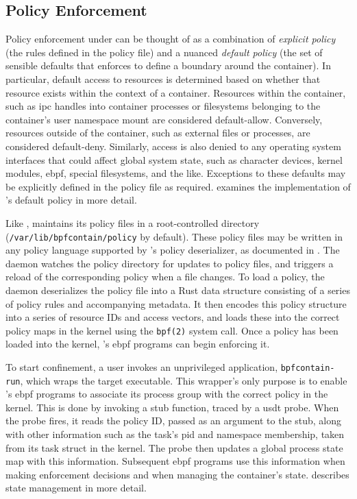 \subsection{Policy Enforcement}%
\label{ss:bpfcontain-enforcement}

Policy enforcement under \bpfcontain{} can be thought of as a combination of
\textit{explicit policy} (the rules defined in the policy file) and a nuanced
\textit{default policy} (the set of sensible defaults that \bpfcontain{} enforces to
define a boundary around the container). In particular, default access to resources is
determined based on whether that resource exists within the context of a container.
Resources within the container, such as \gls{ipc} handles into container processes or
filesystems belonging to the container's user namespace mount are considered
default-allow. Conversely, resources outside of the container, such as external files or
processes, are considered default-deny. Similarly, access is also denied to any operating
system interfaces that could affect global system state, such as character devices, kernel
modules, \gls{ebpf}, special filesystems, and the like. Exceptions to these defaults may
be explicitly defined in the policy file as required. 
examines the implementation of \bpfcontain{}'s default policy in more detail.

Like \bpfbox{}, \bpfcontain{} maintains its policy files in a root-controlled directory
(\texttt{/var/lib/bpfcontain/policy} by default). These policy files may be written in any
policy language supported by \bpfcontain{}'s policy deserializer, as documented in
. The \bpfcontain{} daemon watches the policy directory for
updates to policy files, and triggers a reload of the corresponding policy when a file
changes. To load a policy, the daemon deserializes the policy file into a Rust data
structure consisting of a series of policy rules and accompanying metadata. It then
encodes this policy structure into a series of resource IDs and access vectors, and loads
these into the correct policy maps in the kernel using the \texttt{bpf(2)} system call.
Once a policy has been loaded into the kernel, \bpfcontain{}'s \gls{ebpf} programs can
begin enforcing it.

To start confinement, a user invokes an unprivileged application, \texttt{bpfcontain-run},
which wraps the target executable. This wrapper's only purpose is to enable
\bpfcontain{}'s \gls{ebpf} programs to associate its process group with the correct policy
in the kernel.  This is done by invoking a stub function, traced by a \gls{usdt} probe.
When the probe fires, it reads the policy ID, passed as an argument to the stub, along
with other information such as the task's \gls{pid} and namespace membership, taken from
its task struct in the kernel. The probe then updates a global process state map with this
information. Subsequent \gls{ebpf} programs use this information when making enforcement
decisions and when managing the container's state.  describes
state management in more detail.

